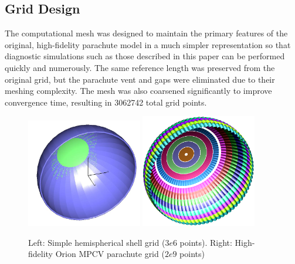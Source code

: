 \documentclass[]{aiaa-tc}%
\begin{document}
\subsection{Grid Design}

The computational mesh was designed to maintain the primary features of the original, high-fidelity parachute model in a much simpler representation so that diagnostic simulations such as those described in this paper can be performed quickly and numerously.  The same reference length was preserved from the original grid, but the parachute vent and gaps were eliminated due to their meshing complexity.  The mesh was also coarsened significantly to improve convergence time, resulting in 3062742 total grid points.


\begin{figure}[htb!]
\begin{center}
\includegraphics[width=0.45\textwidth]{Images/grid_surf.png}
\includegraphics[width=0.45\textwidth]{Images/MPCV_chute_surf.png}
\caption{Left: Simple hemispherical shell grid ($3e6$ points).  Right: High-fidelity Orion MPCV parachute grid ($2e9$ points)}
\label{ChuteSurf}
\end{center}
\end{figure}
\end{document}
